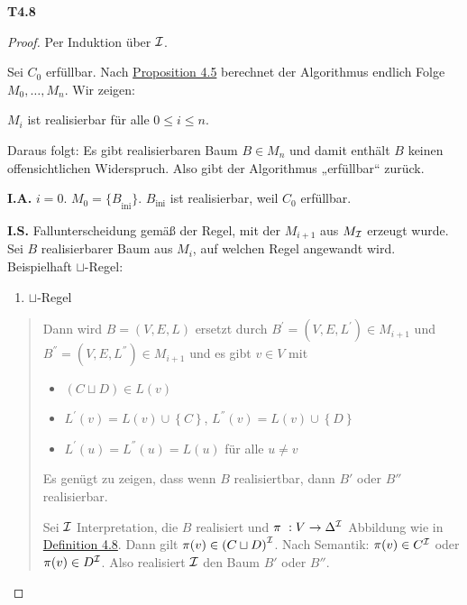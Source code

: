 \textbf{T4.8}

\begin{proof}

Per Induktion über $\mathcal{I}$. 

Sei $C_{0}$ erfüllbar. Nach \protect\hyperlink{proposition-4.5-terminierung}{Proposition 4.5} berechnet der Algorithmus endlich Folge $M_{0},\ldots,M_{n}$. Wir
zeigen: 

$M_{i}$ ist realisierbar für alle $0 \leq i \leq n$. 

Daraus folgt: Es gibt realisierbaren Baum $B \in M_{n}$ und damit enthält $B$ keinen offensichtlichen Widerspruch. Also gibt der Algorithmus „erfüllbar`` zurück.

\textbf{I.A.} $i = 0$. $M_{0} = {\{ B}_{\text{ini}}\}$.
$B_{\text{ini}}$ ist realisierbar, weil $C_{0}$ erfüllbar.

\textbf{I.S.} Fallunterscheidung gemäß der Regel, mit der $M_{i + 1}$
aus $M_{\mathcal{I}}$ erzeugt wurde. Sei $B$ realisierbarer Baum aus
$M_i$, auf welchen Regel angewandt wird. Beispielhaft
$\sqcup$-Regel:

\begin{enumerate}
\def\labelenumi{\arabic{enumi}.}
\item
  $\sqcup$-Regel
\end{enumerate}

\begin{quote}
Dann wird $B = \left( V,E,L \right)$ ersetzt durch
$B^{'} = \left( V,E,L^{'} \right) \in M_{i + 1}$ und
$B^{''} = \left( V,E,L^{''} \right) \in M_{i + 1}$ und es gibt
$v \in V$ mit

\begin{itemize}
\item
  $\left( C \sqcup D \right) \in L(v)$
\item
  $L^{'}\left( v \right) = L\left( v \right) \cup \left\{ C \right\}$,
  $L^{''}\left( v \right) = L\left( v \right) \cup \left\{ D \right\}$
\item
  $L^{'}\left( u \right) = L^{''}\left( u \right) = L\left( u \right)$
  für alle $u \neq v$
\end{itemize}

Es genügt zu zeigen, dass wenn $B$ realisiertbar, dann $B'$ oder
$B''$ realisierbar. 

Sei $\mathcal{I}$ Interpretation, die $B$ realisiert und $\pi\ :V \rightarrow \Delta^{\mathcal{I}}$ Abbildung wie in \protect\hyperlink{realisierbarkeit}{Definition 4.8}. Dann gilt $\pi\left( v \right) \in \left( C \sqcup D \right)^\MI$. Nach Semantik: $\pi\left( v \right) \in C^\MI$ oder $\pi\left( v \right) \in D^\MI$. Also realisiert $\mathcal{I}$ den Baum $B'$ oder $B''$.
\end{quote}
\end{proof}

